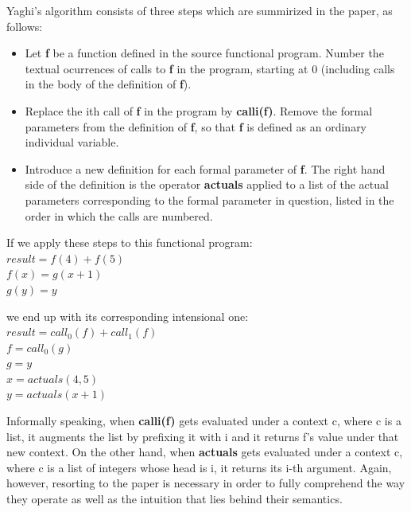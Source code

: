 \documentclass[ack,preface]{dithesis}
\begin{document}
Yaghi's algorithm consists of three steps which are summirized in the paper, as follows:

    \begin{itemize}
    \item Let \textbf{f} be a function defined in the source functional program. Number the textual ocurrences of calls to \textbf{f} in the program, starting at 0 (including calls in the body of the definition of \textbf{f}).
   
   \item Replace the ith call of \textbf{f} in the program by \textbf{calli(f)}. Remove the formal parameters from the definition of \textbf{f}, so that \textbf{f} is defined as an ordinary individual variable.
   
   \item Introduce a new definition for each formal parameter of \textbf{f}. The right hand side of the definition is the operator \textbf{actuals} applied to a list of the actual parameters corresponding to the formal parameter in question, listed in the order in which the calls are numbered.
    \end{itemize}


\begin{flushleft}
If we apply these steps to this functional program:\\
 \setlength{\parindent}{25ex} $result = f(4) + f(5)$ \\
$f(x) = g(x+1)$ \\ 
$g(y) = y$
\end{flushleft}

\begin{flushleft}
we end up with its corresponding intensional one:\\
 \setlength{\parindent}{25ex} $result = call_0(f) + call_1(f)$ \\
$f = call_0(g)$ \\ 
$g = y$ \\
$x = actuals(4,5)$ \\
$y = actuals(x+1)$ \\
\end{flushleft}

Informally speaking, when \textbf{calli(f)} gets evaluated under a context c, where c is  a list, it augments the list by prefixing it with i and it returns f's value under that new context.  On the other hand, when \textbf{actuals} gets evaluated under a context c, where c is a list of  integers whose head is i, it returns its  i-th argument. Again, however, resorting to the paper is necessary in order to fully comprehend the way they operate as well as the intuition that lies behind their semantics.
\end{document}
